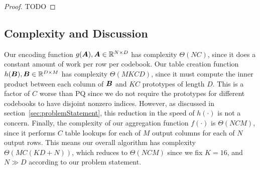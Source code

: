 \begin{proof}
TODO
\end{proof}

\subsection{Complexity and Discussion}

Our encoding function $g(\bm{A}), \bm{A} \in \mathbb{R}^{N \times D}$ has complexity $\Theta(NC)$, since it does a constant amount of work per row per codebook. Our table creation function $h(\bm{B}), \bm{B} \in \mathbb{R}^{D \times M}$ has complexity $\Theta(MKCD)$, since it must compute the inner product between each column of $\bm{B}$ and $KC$ prototypes of length $D$. This is a factor of $C$ worse than PQ since we do not require the prototypes for different codebooks to have disjoint nonzero indices. However, as discussed in section~\ref{sec:problemStatement}, this reduction in the speed of $h(\cdot)$ is not a concern. Finally, the complexity of our aggregation function $f(\cdot)$ is $\Theta(NCM)$, since it performs $C$ table lookups for each of $M$ output columns for each of $N$ output rows. This means our overall algorithm has complexity $\Theta(MC(KD + N))$, which reduces to $\Theta(NCM)$ since we fix $K = 16$, and $N \gg D$ according to our problem statement.















